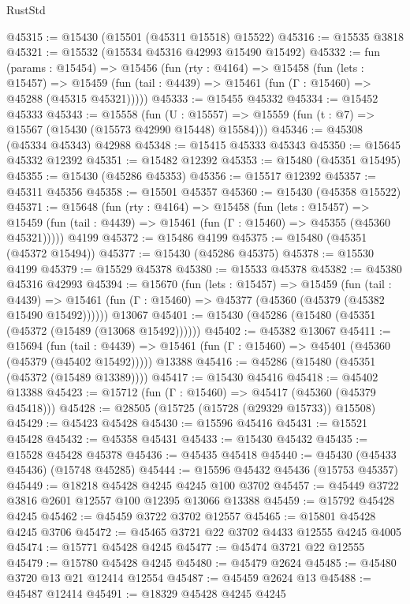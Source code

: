 \begin{lexlean}{RustStd}
\begin{coremodule}
{\begin{coremodule}
{{{{{{{{{{{{{{{{{{{{{{{{{{{{{{{{{{{{{{{{{{{{{{{{{{{{{{{{{{{{@45315 := @15430 (@15501 (@45311 @15518) @15522)
@45316 := @15535 @3818
@45321 := @15532 (@15534 @45316 @42993 @15490 @15492)
@45332 := fun (params : @15454) =>
  @15456
    (fun (rty : @4164) =>
    @15458
      (fun (lets : @15457) =>
      @15459 (fun (tail : @4439) => @15461 (fun (Γ : @15460) => @45288 (@45315 @45321)))))
@45333 := @15455 @45332
@45334 := @15452 @45333
@45343 := @15558
    (fun (U : @15557) => @15559 (fun (t : @7) => @15567 (@15430 (@15573 @42990 @15448) @15584)))
@45346 := @45308 (@45334 @45343) @42988
@45348 := @15415 @45333 @45343
@45350 := @15645 @45332 @12392
@45351 := @15482 @12392
@45353 := @15480 (@45351 @15495)
@45355 := @15430 (@45286 @45353)
@45356 := @15517 @12392
@45357 := @45311 @45356
@45358 := @15501 @45357
@45360 := @15430 (@45358 @15522)
@45371 := @15648
    (fun (rty : @4164) =>
    @15458
      (fun (lets : @15457) =>
      @15459 (fun (tail : @4439) => @15461 (fun (Γ : @15460) => @45355 (@45360 @45321)))))
    @4199
@45372 := @15486 @4199
@45375 := @15480 (@45351 (@45372 @15494))
@45377 := @15430 (@45286 @45375)
@45378 := @15530 @4199
@45379 := @15529 @45378
@45380 := @15533 @45378
@45382 := @45380 @45316 @42993
@45394 := @15670
    (fun (lets : @15457) =>
    @15459
      (fun (tail : @4439) =>
      @15461 (fun (Γ : @15460) => @45377 (@45360 (@45379 (@45382 @15490 @15492))))))
    @13067
@45401 := @15430 (@45286 (@15480 (@45351 (@45372 (@15489 (@13068 @15492))))))
@45402 := @45382 @13067
@45411 := @15694
    (fun (tail : @4439) => @15461 (fun (Γ : @15460) => @45401 (@45360 (@45379 (@45402 @15492)))))
    @13388
@45416 := @45286 (@15480 (@45351 (@45372 (@15489 @13389))))
@45417 := @15430 @45416
@45418 := @45402 @13388
@45423 := @15712 (fun (Γ : @15460) => @45417 (@45360 (@45379 @45418)))
@45428 := @28505 (@15725 (@15728 (@29329 @15733)) @15508)
@45429 := @45423 @45428
@45430 := @15596 @45416
@45431 := @15521 @45428
@45432 := @45358 @45431
@45433 := @15430 @45432
@45435 := @15528 @45428 @45378
@45436 := @45435 @45418
@45440 := @45430 (@45433 @45436) (@15748 @45285)
@45444 := @15596 @45432 @45436 (@15753 @45357)
@45449 := @18218 @45428 @4245 @4245 @100 @3702
@45457 := @45449 @3722 @3816 @2601 @12557 @100 @12395 @13066 @13388
@45459 := @15792 @45428 @4245
@45462 := @45459 @3722 @3702 @12557
@45465 := @15801 @45428 @4245 @3706
@45472 := @45465 @3721 @22 @3702 @4433 @12555 @4245 @4005
@45474 := @15771 @45428 @4245
@45477 := @45474 @3721 @22 @12555
@45479 := @15780 @45428 @4245
@45480 := @45479 @2624
@45485 := @45480 @3720 @13 @21 @12414 @12554
@45487 := @45459 @2624 @13
@45488 := @45487 @12414
@45491 := @18329 @45428 @4245 @4245
}}}}}}}}}}}}}}}}}}}}}}}}}}}}}}}}}}}}}}}}}}}}}}}}}}}}}}}}}}}}
\end{coremodule}}
\end{coremodule}
\end{lexlean}
